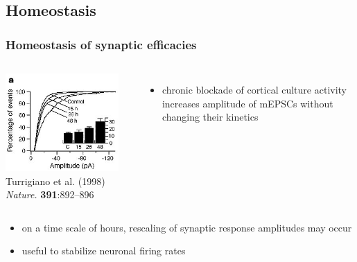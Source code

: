 \documentclass{beamer}
\begin{document}
\subsection{Homeostasis}

\begin{frame}
  \frametitle{Homeostasis of synaptic efficacies}

\begin{columns}
\includegraphics[width=0.9\textwidth]{./figures/homeo}
\vspace*{3mm}
\tiny{Turrigiano et al. (1998)\\
\textit{Nature.} \textbf{391}:892--896}

\small
{
\begin{itemize}
  \item chronic blockade of cortical culture activity increases amplitude of mEPSCs without changing their kinetics
\end{itemize}
}

\end{columns}

\vspace*{3mm}

\small
{
\begin{itemize}
  \item on a time scale of hours, rescaling of synaptic response amplitudes may occur
  \item useful to stabilize neuronal firing rates
\end{itemize}
}

\end{frame}
\end{document}
